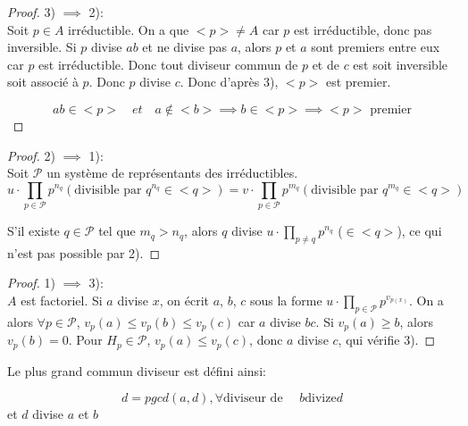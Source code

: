 \begin{proof}

	3) $\implies$ 2):\\
	Soit $p \in A$ irréductible. On a que $<p> \neq A$ car $p$ est irréductible, donc pas inversible.
	Si $p$ divise $ab$ et ne divise pas $a$, alors $p$ et $a$ sont premiers entre eux car $p$ est irréductible.
	Donc tout diviseur commun de $p$ et de $c$ est soit inversible soit associé à $p$. Donc $p$ divise $c$.
	Donc d'après 3), $<p>$ est premier.

	\[ ab \in <p>\quad  et \quad a \notin <b> \implies b \in <p> \implies <p> \text{ premier} \]

\end{proof}

\begin{proof}

	2) $\implies$ 1):\\
	Soit $\mathcal{P}$ un système de représentants des irréductibles.
	\begin{equation*}
		u \cdot \prod_{p \in \mathcal{P}} p^{n_q} (\text{divisible par } q^{n_q} \in <q> ) = v \cdot \prod_{p \in \mathcal{P}} p^{m_q} (\text{divisible par } q^{m_q} \in <q>)
	\end{equation*}
	\noindent

	S'il existe $q \in \mathcal{P}$ tel que $m_q > n_q$, alors $q$ divise $u \cdot \prod_{p \ne q} p^{n_q}$ ($\in <q>$), ce qui n'est pas possible par 2).

\end{proof}

\begin{proof}

	1) $\implies$ 3):\\
	$A$ est factoriel. Si $a$  divise $x$, on écrit $a$, $b$, $c$ sous la forme $u \cdot \prod_{p \in \mathcal{P}} p^{v_{p(x)}}$.
	On a alors $\forall p \in \mathcal{P}$, $v_p(a) \leqslant v_p(b) \leqslant v_p(c)$ car $a$ divise $bc$.
	Si $v_p(a) \geqslant b$, alors $v_p(b) = 0$.
	Pour $H_p \in \mathcal{P}$, $v_p(a) \leqslant v_p(c)$, donc $a$ divise $c$, qui vérifie 3).

\end{proof}


\begin{definition}[pgcd]
	Le plus grand commun diviseur est défini ainsi:

	$$d = pgcd (a,d), \forall \text{diviseur de } \quad     b \text{divize} d$$
	et $d$ divise $a$ et $b$
\end{definition}

